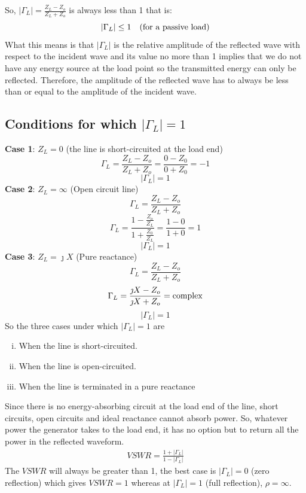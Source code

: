 So, $	|\Gamma_L| = \frac{Z_L-Z_o}{Z_L+Z_o}$ is always less than 1 that is:
\begin{equation*}
|\Gamma_L|\leq 1\quad  (\textnormal{for  a  passive load})
\end{equation*}
What this means is that $|\Gamma_L|$ is the relative amplitude of the reflected wave with respect to the incident wave and its value no more than 1 implies that we do not have any energy source at the load point so the transmitted energy  can only be reflected. Therefore, the amplitude of the reflected wave has to always be less than or equal to the amplitude of the incident wave.

\subsection{Conditions for which $|\Gamma_L|=1$}
\textbf{Case 1}: $Z_L=0$ (the line is short-circuited at the load end)
\begin{equation*}	
\Gamma_L= \frac{Z_L -Z_o}{Z_L + Z_o} =  \frac{0 -Z_0}{0 + Z_0} = -1	
\end{equation*}
\begin{equation*}
|\Gamma_L|=1
\end{equation*}	
\textbf{Case 2}: $Z_L=\infty$ (Open circuit line)
\begin{equation*}
\Gamma_L= \frac{Z_L -Z_o}{Z_L + Z_o}
\end{equation*}
\begin{equation*}
\Gamma_L = \frac{1 -\frac{Z_o}{Z_L}}{1 + \frac{Z_0}{Z_L}} = \frac{1 - 0}{1 + 0} = 1
\end{equation*}
\begin{equation*}
|\Gamma_L| = 1
\end{equation*}
\textbf{Case 3}: $Z_L = \jmath X$ (Pure reactance)
\begin{equation*}
\Gamma_L= \frac{Z_L -Z_o}{Z_L + Z_o}
\end{equation*}
\begin{equation*}
\Gamma_L = \frac{\jmath X - Z_o}{\jmath X + Z_o} = \textnormal{complex}
\end{equation*}
\begin{equation*}
|\Gamma_L| = 1
\end{equation*}
So the three cases under which $|\Gamma_L|=1$ are
\begin{enumerate}[(i)]
\item When the line is short-circuited.
\item When the line is open-circuited.
\item When the line is terminated in a pure reactance
\end{enumerate}
Since there is no energy-absorbing circuit at the load end of the line, short circuits, open circuits and ideal reactance cannot absorb power. So, whatever power the generator takes to the load end, it has no option but to return all the power in the reflected waveform.
\begin{align*}
VSWR  = \frac{1+|\Gamma_L|}{1-|\Gamma_L|}
\end{align*}
The $VSWR$ will always be greater than 1, the best case is $|\Gamma_L|=0$ (zero reflection) which gives $VSWR=1$ whereas at $|\Gamma_L|=1$ (full reflection), $\rho= \infty$.

